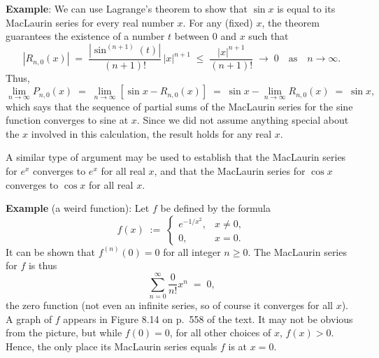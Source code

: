 \documentclass[12pt,fleqn]{article}
\begin{document}
\vs{0.2in}
\ni
{\bf Example}: We can use Lagrange's theorem to show that $\sin x$
is equal to its MacLaurin series for every real number $x$.
For any (fixed) $x$, the theorem guarantees the existence of
a number $t$ between 0 and $x$ such that
$$ \left|R_{n,0}(x)\right|
	\;=\; \frac{|\sin^{(n+1)}(t)|}{(n+1)!}\,|x|^{n+1}
	\;\le\; \frac{|x|^{n+1}}{(n+1)!}
	\;\rightarrow\; 0 \quad\mbox{as}\quad n\rightarrow\infty. $$
Thus,
$$ \lim_{n\rightarrow\infty} P_{n,0}(x)
	\;=\; \lim_{n\rightarrow\infty} \left[\sin x - R_{n,0}(x)\right]
	\;=\; \sin x - \lim_{n\rightarrow\infty} R_{n,0}(x)
	\;=\; \sin x, $$
which says that the sequence of partial sums of the MacLaurin
series for the sine function converges to sine at $x$.
Since we did not assume anything special about the $x$ involved
in this calculation, the result holds for any real $x$.

\np
\ni
A similar type of argument may be used to establish that the
MacLaurin series for $e^x$ converges to $e^x$ for all real
$x$, and that the MacLaurin series for $\cos x$ converges to
$\cos x$ for all real $x$.

\vspace{0.3in}
\ni
{\bf Example} (a weird function):  Let $f$ be defined by the formula
$$ f(x) \;:=\; \left\{\begin{array}{ll}
	e^{-1/x^2}, & x \ne 0, \\[6pt]
	0, & x = 0.
  \end{array}\right. $$
It can be shown that $f^{(n)}(0) = 0$ for all integer $n \ge 0$.
The MacLaurin series for $f$ is thus
$$ \sum_{n=0}^\infty \frac{0}{n!} x^n \;=\; 0, $$
the zero function (not even an infinite series, so of course
it converges for all $x$).  A graph of $f$ appears in
Figure 8.14 on p.~558 of the text.  It may not be obvious from
the picture, but while $f(0) = 0$, for all other choices of $x$,
$f(x) > 0$.  Hence, the only place its MacLaurin series equals
$f$ is at $x=0$.
\end{document}
